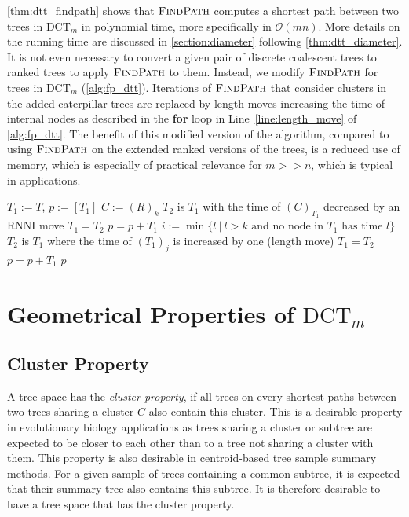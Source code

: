 \documentclass[11pt]{amsart}
\newcommand{\rnni}{\mathrm{RNNI}}
\newcommand{\findpath}{\textsc{FindPath}}
\newcommand{\ntime}{\mathrm{time}}
\newcommand{\dtt}{\mathrm{DCT}}
\renewcommand{\O}{\mathcal O}
\newcommand{\summary}[1]{} %
\begin{document}
\summary{Running time of $\findpath$ + we don't need to add subtree in practice}
\autoref{thm:dtt_findpath} shows that $\findpath$ computes a shortest path between two trees in $\dtt_m$ in polynomial time, more specifically in $\O(mn)$.
More details on the running time are discussed in \autoref{section:diameter} following \autoref{thm:dtt_diameter}.
It is not even necessary to convert a given pair of discrete coalescent trees to ranked trees to apply $\findpath$ to them.
Instead, we modify $\findpath$ for trees in $\dtt_m$ (\autoref{alg:fp_dtt}).
Iterations of $\findpath$ that consider clusters in the added caterpillar trees are replaced by length moves increasing the time of internal nodes as described in the \textbf{for} loop in Line~\ref{line:length_move} of \autoref{alg:fp_dtt}.
The benefit of this modified version of the algorithm, compared to using $\findpath$ on the extended ranked versions of the trees, is a reduced use of memory, which is especially of practical relevance for $m >> n$, which is typical in applications.

\begin{algorithm}[h]
	\caption{$\findpath$($T,R$)}
	\begin{algorithmic}[1]
		\label{alg:fp_dtt}
		\STATE $T_1 := T$, $p := [T_1]$
			\STATE $C:=(R)_k$
			\WHILE {$\ntime((C)_{T_1})>k$}
					\STATE $T_2$ is $T_1$ with the time of $(C)_{T_1}$ decreased by an $\rnni$ move
				\STATE $T_1 = T_2$
				\STATE $p = p+T_1$
			\ENDWHILE
				\STATE $i := \min\{l \ |\  l>k \text{ and no node in } T_1 \text{ has time }l\}$
					\label{line:length_move}
					\STATE $T_2$ is $T_1$ where the time of $(T_1)_j$ is increased by one (length move)
					\STATE $T_1 = T_2$
					\STATE $p = p+T_1$
				\ENDFOR
			\ENDIF
		\ENDFOR
		\RETURN $p$
	\end{algorithmic}
\end{algorithm}


\section{Geometrical Properties of $\dtt_m$}
\label{section:geometry}

\subsection{Cluster Property}
\label{section:cluster_property}
\summary{Definition of Cluster Property and why it is relevant (a bit of bio).}
A tree space has the \emph{cluster property}, if all trees on every shortest paths between two trees sharing a cluster $C$ also contain this cluster.
This is a desirable property in evolutionary biology applications as trees sharing a cluster or subtree are expected to be closer to each other than to a tree not sharing a cluster with them.
This property is also desirable in centroid-based tree sample summary methods.
For a given sample of trees containing a common subtree, it is expected that their summary tree also contains this subtree.
It is therefore desirable to have a tree space that has the cluster property.
\end{document}
